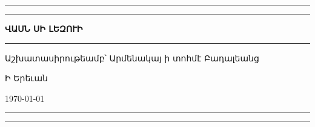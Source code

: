 
\begin{titlepage}
\begingroup
\newlength\drop{}\textheight

\setlength{\parindent}{0pt}

\rule{\textwidth}{1pt}\par
\vspace{2pt}\vspace{-\baselineskip}
\rule{\textwidth}{0.4pt}\par

\vspace\drop
\centering

{\fontsize{42}{42}\selectfont\textbf{ՎԱՍՆ ՍԻ ԼԵԶՈՒԻ}}
\null\vskip12pt\null

\vspace{0.25\drop}
\rule{0.3\textwidth}{0.4pt}\par
\vspace{\drop}

{\Large Աշխատասիրութեամբ՝}
\medskip
{\Large Արմենակայ ի տոհմէ Բադալեանց}

\vfill

{\large Ի Երեւան}

{\large\today}

\rule{\textwidth}{0.4pt}\par
\vspace{2pt}\vspace{-\baselineskip}
\rule{\textwidth}{1pt}\par

\endgroup

\end{titlepage}

\begin{titlepage}
\null
\end{titlepage}
